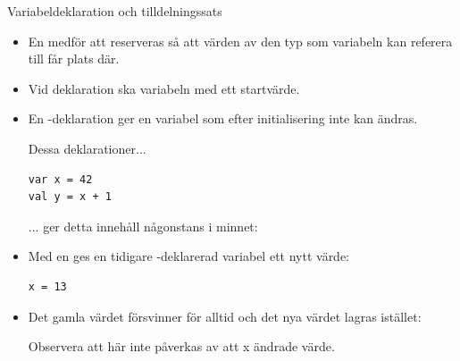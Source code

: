 \begin{Slide}{Variabeldeklaration och tilldelningssats}\SlideFontTiny

\begin{itemize}
\item En  medför att  reserveras så att värden av den typ som variabeln kan referera till får plats där.

\item Vid deklaration ska variabeln  med ett startvärde.

\item En -deklaration ger en variabel som efter initialisering inte kan ändras.


\begin{multicols}{2}
Dessa deklarationer...
\begin{lstlisting}
var x = 42
val y = x + 1
\end{lstlisting}
... ger detta innehåll någonstans i minnet:



\end{multicols}


\item Med en  ges en tidigare -deklarerad variabel ett nytt värde:
\begin{lstlisting}
x = 13
\end{lstlisting}

\item Det gamla värdet försvinner för alltid och det nya värdet lagras istället: \\

Observera att  här inte påverkas av att x ändrade värde.
\end{itemize}
\end{Slide}

